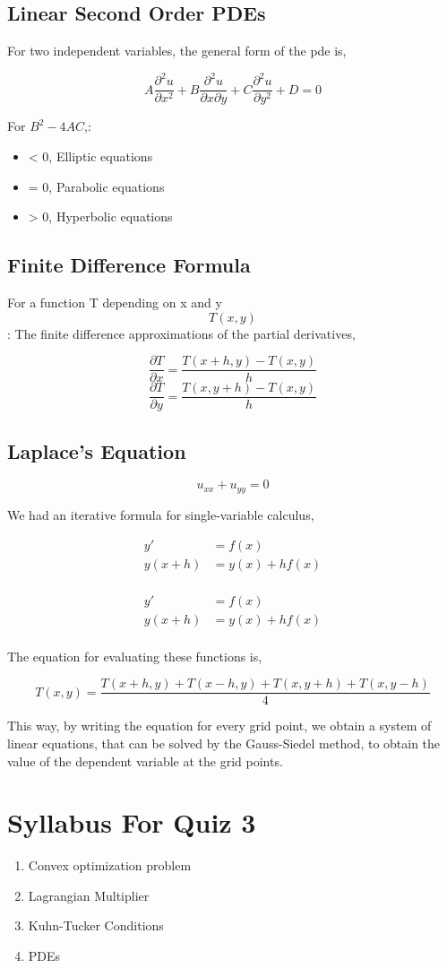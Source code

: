 \documentclass[11pt]{report}
\begin{document}
\chapter{Linear Second Order PDEs}
\label{sec:org4e0f084}
For two independent variables, the general form of the pde is,

$$A \frac{\partial^2u}{\partial x^2}+B \frac{\partial ^2 u }{\partial x \partial y} + C \frac{\partial^2u}{\partial y^2}+ D = 0$$

For \(B^2 - 4AC\),:
\begin{itemize}
\item < 0, Elliptic equations
\item = 0, Parabolic equations
\item > 0, Hyperbolic equations
\end{itemize}
\chapter{Finite Difference Formula}
\label{sec:org81b33ee}

For a function T depending on x and y $$T(x,y)$$: The finite difference approximations of the partial derivatives,

$$\frac{\partial T}{\partial x} = \frac{T(x+h,y)-T(x,y)}{h}$$
$$\frac{\partial T}{\partial y} = \frac{T(x,y+h)-T(x,y)}{h}$$
\chapter{Laplace's Equation}
\label{sec:org5050931}

$$u_{xx} + u_{yy} = 0$$

We had an iterative formula for single-variable calculus,

\begin{align*}
y' &= f(x) \\
y(x+h) &= y(x) + hf(x) \\
\end{align*}

\begin{align*}
y' &= f(x) \\
y(x+h) &= y(x) + hf(x) \\
\end{align*}

The equation for evaluating these functions is,

$$T(x,y)  = \frac{T(x+h,y) + T(x-h,y) + T(x,y+h) + T(x,y-h)}{4}$$

This way, by writing the equation for every grid point, we obtain a system of linear equations, that can be solved by the Gauss-Siedel method, to obtain the value of the dependent variable at the grid points.
\part{Syllabus For Quiz 3}
\label{sec:orgd6158cb}
\begin{enumerate}
\item Convex optimization problem
\item Lagrangian Multiplier
\item Kuhn-Tucker Conditions
\item PDEs
\end{enumerate}
\end{document}
